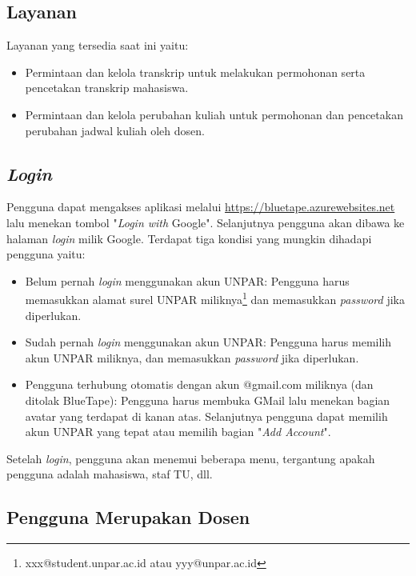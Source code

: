 \subsection{Layanan}
\label{sec:bluetape_layanan}
Layanan yang tersedia saat ini yaitu:
\begin{itemize}
	\item Permintaan dan kelola transkrip untuk melakukan permohonan serta pencetakan transkrip mahasiswa.
	\item Permintaan dan kelola perubahan kuliah untuk permohonan dan pencetakan perubahan jadwal kuliah oleh dosen.
\end{itemize}

\subsection{\textit{Login}}
\label{sec:bluetape_login}
Pengguna dapat mengakses aplikasi melalui \url{https://bluetape.azurewebsites.net} lalu menekan tombol "\textit{Login with} Google". Selanjutnya pengguna akan dibawa ke halaman \textit{login} milik Google. Terdapat tiga kondisi yang mungkin dihadapi pengguna yaitu:
\begin{itemize}
	\item Belum pernah \textit{login} menggunakan akun UNPAR: Pengguna harus memasukkan alamat surel UNPAR miliknya\footnote{xxx@student.unpar.ac.id atau yyy@unpar.ac.id} dan memasukkan \textit{password} jika diperlukan.
	\item Sudah pernah \textit{login} menggunakan akun UNPAR: Pengguna harus memilih akun UNPAR miliknya, dan memasukkan \textit{password} jika diperlukan.
	\item Pengguna terhubung otomatis dengan akun @gmail.com miliknya (dan ditolak BlueTape): Pengguna harus membuka GMail lalu menekan bagian avatar yang terdapat di kanan atas. Selanjutnya pengguna dapat memilih akun UNPAR yang tepat atau memilih bagian "\textit{Add Account}".
\end{itemize}

Setelah \textit{login}, pengguna akan menemui beberapa menu, tergantung apakah pengguna adalah mahasiswa, staf TU, dll.

\subsection{Pengguna Merupakan Dosen}
\label{sec:bluetape_dosen}

